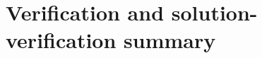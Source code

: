 \section{Verification and solution-verification summary}
\label{sec:numerical-framework:verification}
